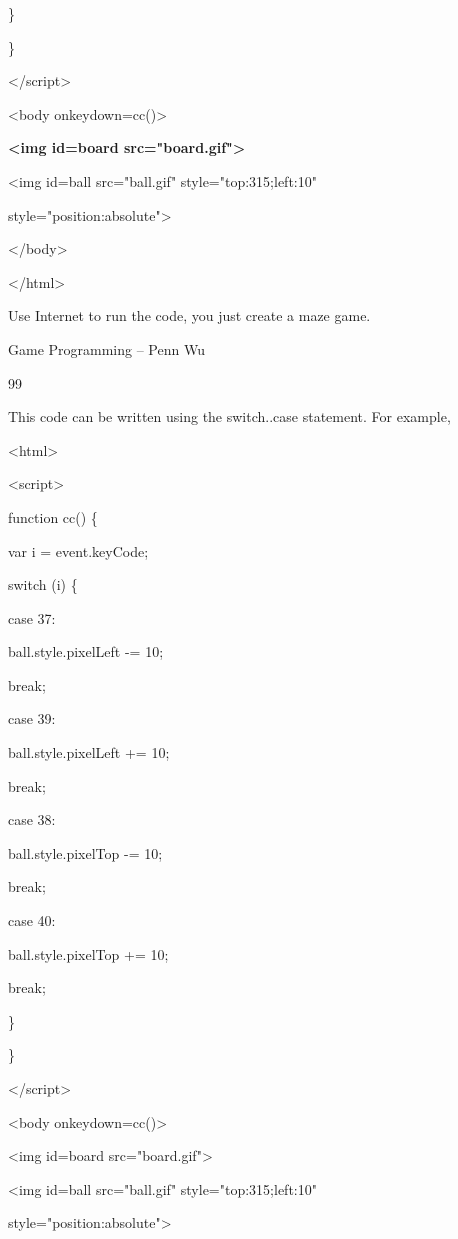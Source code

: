 \documentclass[
]{article}
\begin{document}
\}

\}

\textless/script\textgreater{}

\textless body onkeydown=cc()\textgreater{}

\textbf{\textless img id=board src="board.gif"\textgreater{}}

\textless img id=ball src="ball.gif" style="top:315;left:10"

style="position:absolute"\textgreater{}

\textless/body\textgreater{}

\textless/html\textgreater{}

Use Internet to run the code, you just create a maze game.

Game Programming -- Penn Wu

99

\protect\hypertarget{index_split_007.htmlux5cux23p100}{}{}

This code can be written using the switch..case statement. For example,

\textless html\textgreater{}

\textless script\textgreater{}

function cc() \{

var i = event.keyCode;

switch (i) \{

case 37:

ball.style.pixelLeft -= 10;

break;

case 39:

ball.style.pixelLeft += 10;

break;

case 38:

ball.style.pixelTop -= 10;

break;

case 40:

ball.style.pixelTop += 10;

break;

\}

\}

\textless/script\textgreater{}

\textless body onkeydown=cc()\textgreater{}

\textless img id=board src="board.gif"\textgreater{}

\textless img id=ball src="ball.gif" style="top:315;left:10"

style="position:absolute"\textgreater{}
\end{document}
